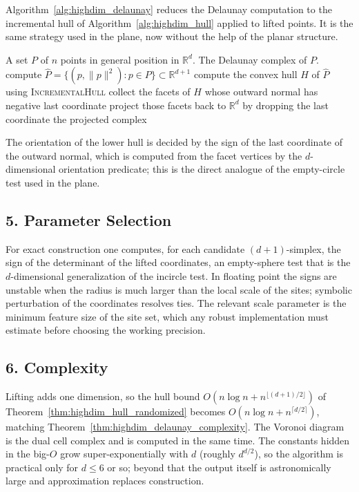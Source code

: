 Algorithm~\ref{alg:highdim_delaunay} reduces the Delaunay computation to the
incremental hull of Algorithm~\ref{alg:highdim_hull} applied to lifted points.
It is the same strategy used in the plane, now without the help of the planar
structure.

\begin{algorithm}[htbp]
\caption{Delaunay Complex in $\mathbb{R}^d$ by Lifting}
\label{alg:highdim_delaunay}
\begin{algorithmic}[1]
\Require A set $P$ of $n$ points in general position in $\mathbb{R}^d$.
\Ensure The Delaunay complex of $P$.
  \State compute $\widehat{P} = \{ (p, \|p\|^2) : p \in P \} \subset \mathbb{R}^{d+1}$
  \State compute the convex hull $H$ of $\widehat{P}$ using \textsc{IncrementalHull}
  \State collect the facets of $H$ whose outward normal has negative last coordinate 
  \State project those facets back to $\mathbb{R}^d$ by dropping the last coordinate
  \State \Return the projected complex
\EndFunction
\end{algorithmic}
\end{algorithm}

The orientation of the lower hull is decided by the sign of the last
coordinate of the outward normal, which is computed from the facet vertices
by the $d$-dimensional orientation predicate; this is the direct analogue of
the empty-circle test used in the plane.

\subsection{5. Parameter Selection}

For exact construction one computes, for each candidate $(d+1)$-simplex, the
sign of the determinant of the lifted coordinates, an empty-sphere test that
is the $d$-dimensional generalization of the incircle test. In floating
point the signs are unstable when the radius is much larger than the local
scale of the sites; symbolic perturbation of the coordinates resolves ties.
The relevant scale parameter is the minimum feature size of the site set,
which any robust implementation must estimate before choosing the working
precision.

\subsection{6. Complexity}

Lifting adds one dimension, so the hull bound
$O(n \log n + n^{\lfloor (d+1)/2 \rfloor})$ of
Theorem~\ref{thm:highdim_hull_randomized} becomes
$O(n \log n + n^{\lceil d/2 \rceil})$, matching
Theorem~\ref{thm:highdim_delaunay_complexity}. The Voronoi diagram is the
dual cell complex and is computed in the same time. The constants hidden in
the big-$O$ grow super-exponentially with $d$ (roughly $d^{d/2}$), so the
algorithm is practical only for $d \le 6$ or so; beyond that the output itself
is astronomically large and approximation replaces construction.


